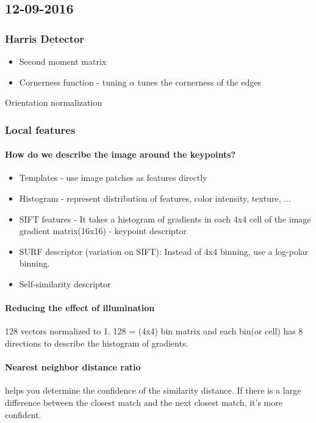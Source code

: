 \subsection{12-09-2016}
\subsubsection{Harris Detector}
\begin{itemize}
	\item Second moment matrix
	\item Cornerness function - tuning $\alpha$ tunes the cornerness of the edges
\end{itemize}
Orientation normalization

\subsubsection{Local features}
\paragraph{How do we describe the image around the keypoints?}
\begin{itemize}
	\item Templates - use image patches as features directly
	\item Histogram - represent distribution of features, color intensity, texture, ...
	\item SIFT features - It takes a histogram of gradients in each 4x4 cell of the image gradient matrix(16x16) - keypoint descriptor
	\item SURF descriptor (variation on SIFT): Instead of 4x4 binning, use a log-polar binning.
	\item Self-similarity descriptor
\end{itemize}

\paragraph{Reducing the effect of illumination}
128 vectors normalized to 1. 128 = (4x4) bin matrix and each bin(or cell) has 8 directions to describe the histogram of gradients.
\paragraph{Nearest neighbor distance ratio} helps you determine the confidence of the similarity distance. If there is a large difference between the closest match and the next closest match, it's more confident.